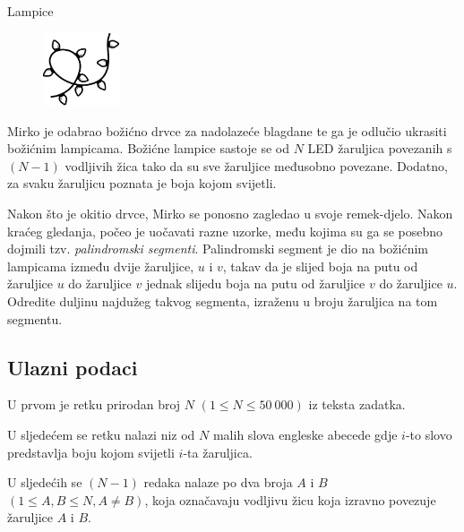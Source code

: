 \begin{statement}[
  problempoints=110,
  timelimit=5 sekundi,
  memorylimit=512 MiB,
]{Lampice}

\setlength\intextsep{-0.1cm}
\begin{figure}
\centering
\includegraphics[width=0.2\textwidth]{img/lampice.png}
\end{figure}

Mirko je odabrao božićno drvce za nadolazeće blagdane te ga je odlučio ukrasiti
božićnim lampicama. Božićne lampice sastoje se od $N$ LED žaruljica povezanih s
$(N - 1)$ vodljivih žica tako da su sve žaruljice međusobno povezane. Dodatno,
za svaku žaruljicu poznata je boja kojom svijetli.

Nakon što je okitio drvce, Mirko se ponosno zagledao u svoje remek-djelo. Nakon
kraćeg gledanja, počeo je uočavati razne uzorke, među kojima su ga se posebno
dojmili tzv. \textit{palindromski segmenti}. Palindromski segment je dio na
božićnim lampicama između dvije žaruljice, $u$ i $v$, takav da je slijed boja na
putu od žaruljice $u$ do žaruljice $v$ jednak slijedu boja na putu od žaruljice
$v$ do žaruljice $u$.
Odredite duljinu najdužeg takvog segmenta, izraženu u broju žaruljica na tom
segmentu.


\subsection*{Ulazni podaci}
U prvom je retku prirodan broj $N$ $(1 \le N \le 50\ 000)$ iz teksta zadatka.

U sljedećem se retku nalazi niz od $N$ malih slova engleske abecede gdje $i$-to
slovo predstavlja boju kojom svijetli $i$-ta žaruljica.

U sljedećih se $(N - 1)$ redaka nalaze po dva broja $A$ i $B$
$(1 \le A, B \le N, A \neq B)$,
koja označavaju vodljivu žicu koja izravno povezuje žaruljice $A$ i $B$.


\end{statement}
